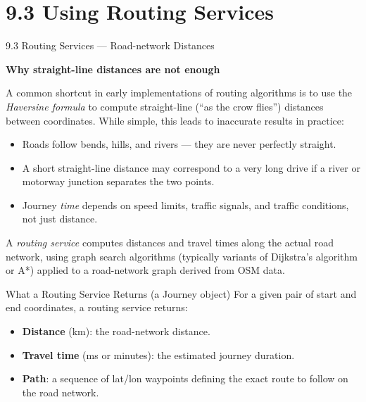 \documentclass[aspectratio=169,10pt]{beamer}
\begin{document}
\section{9.3 Using Routing Services}

\begin{frame}[allowframebreaks]{9.3 Routing Services --- Road-network Distances}

  \textbf{Why straight-line distances are not enough}

  \medskip
  A common shortcut in early implementations of routing algorithms is to
  use the \emph{Haversine formula} to compute straight-line (``as the crow
  flies'') distances between coordinates.  While simple, this leads to
  inaccurate results in practice:

  \begin{itemize}
    \item Roads follow bends, hills, and rivers --- they are never perfectly
          straight.
    \item A short straight-line distance may correspond to a very long drive
          if a river or motorway junction separates the two points.
    \item Journey \emph{time} depends on speed limits, traffic signals, and
          traffic conditions, not just distance.
  \end{itemize}

  A \emph{routing service} computes distances and travel times along the
  actual road network, using graph search algorithms (typically variants of
  Dijkstra's algorithm or A*) applied to a road-network graph derived from
  OSM data.

  \begin{block}{What a Routing Service Returns (a Journey object)}
    For a given pair of start and end coordinates, a routing service returns:
    \begin{itemize}
      \item \textbf{Distance} (km): the road-network distance.
      \item \textbf{Travel time} (ms or minutes): the estimated journey duration.
      \item \textbf{Path}: a sequence of lat/lon waypoints defining the exact
            route to follow on the road network.
    \end{itemize}
  \end{block}


\end{frame}
\end{document}
